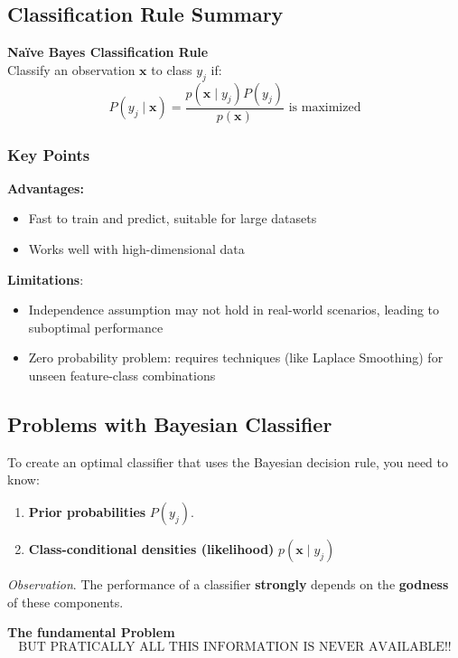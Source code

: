 \documentclass[a4paper]{article}
\theoremstyle{definition}
\begin{document}
\subsection{Classification Rule Summary}
\begin{tcolorbox}[
    colback=blue!15!white,
    colframe=blue!15!white,
    boxrule=0pt,
    arc=0pt,
    halign=center
]
    \textbf{Naïve Bayes Classification Rule}\\[0.6em]
    Classify an observation \( \mathbf{x} \) to class \( y_j \) if:
    \[
      P(y_j\mid \mathbf{x}) = \frac{p(\mathbf{x}\mid y_j)P(y_j)}{p(\mathbf{x})} \text{ is maximized}
    \]
\end{tcolorbox}
\subsubsection{Key Points}
\textbf{Advantages:}
\begin{itemize}
    \item Fast to train and predict, suitable for large datasets 
    \item Works well with high-dimensional data
\end{itemize}
\textbf{Limitations}:
\begin{itemize}
    \item Independence assumption may not hold in real-world scenarios, leading to suboptimal performance 
    \item Zero probability problem: requires techniques (like Laplace Smoothing) for unseen feature-class combinations
\end{itemize}
\subsection{Problems with Bayesian Classifier}
To create an optimal classifier that uses the Bayesian decision rule, you need to know:
\begin{enumerate}
    \item \textbf{Prior probabilities} \( P(y_j) \).
    \item \textbf{Class-conditional densities (likelihood)} \( p(\mathbf{x} \mid y_j) \)
\end{enumerate}
\textit{Observation}. The performance of a classifier \textbf{strongly} depends on the \textbf{godness} of these components.
\begin{tcolorbox}[
    colback=red!15!white,
    colframe=red!15!white,
    boxrule=0pt,
    arc=0pt,
    halign=center
]
    \textbf{The fundamental Problem}\\[0.6em]
    \[
      \text{BUT PRATICALLY ALL THIS INFORMATION
      IS NEVER AVAILABLE!!}
    \]
\end{tcolorbox}
\end{document}

